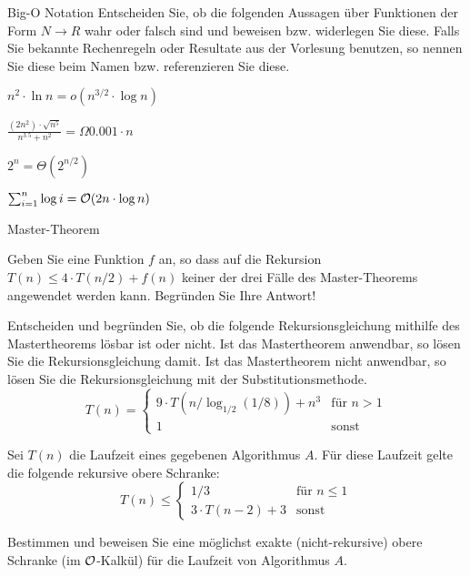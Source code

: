 \documentclass{article}
\begin{document}
\begin{eexercises}{Big-O Notation}{
    Entscheiden Sie, ob die folgenden Aussagen über Funktionen der Form $N \to R$ wahr oder falsch sind und beweisen bzw. widerlegen Sie diese. Falls Sie bekannte Rechenregeln oder Resultate aus der Vorlesung benutzen, so nennen Sie diese beim Namen bzw. referenzieren Sie diese.
  }
  \item $n^2\cdot \ln{n} = o(n^{3/2}\cdot \log{n})$
  \item $\frac{(2n^2)\cdot \sqrt{n^5}}{n^{3.5}+n^2} = \Omega{0.001\cdot n}$
  \item $2^n = \Theta(2^{n/2})$
  \item $\sum_{i=1}^n \log{i} = \mathcal{O}(2n\cdot \log{n})$
\end{eexercises}

\begin{exercises}{Master-Theorem}
\item Geben Sie eine Funktion $f$ an, so dass auf die Rekursion $T(n) \leq 4 \cdot T(n/2) + f(n)$ keiner der drei Fälle des Master-Theorems angewendet werden kann. Begründen Sie Ihre Antwort!
\item Entscheiden und begründen Sie, ob die folgende Rekursionsgleichung mithilfe des Mastertheorems lösbar ist oder nicht. Ist das Mastertheorem anwendbar, so lösen Sie die Rekursionsgleichung damit. Ist das Mastertheorem nicht anwendbar, so lösen Sie die Rekursionsgleichung mit der Substitutionsmethode.
\begin{equation*}
  T(n) = \begin{cases}
    9 \cdot T(n/\log_{1/2}(1/8)) + n^3 & \text{für } n > 1 \\
    1                                  & \text{sonst}
  \end{cases}
\end{equation*}
\item Sei $T(n)$ die Laufzeit eines gegebenen Algorithmus $A$. Für diese Laufzeit gelte die folgende rekursive obere Schranke:
\begin{equation*}
  T(n) \leq \begin{cases}
    1/3                & \text{für } n \leq 1 \\
    3 \cdot T(n-2) + 3 & \text{sonst}
  \end{cases}
\end{equation*}
\item Bestimmen und beweisen Sie eine möglichst exakte (nicht-rekursive) obere Schranke (im $\mathcal{O}$-Kalkül) für die Laufzeit von Algorithmus $A$.
\end{exercises}
\end{document}
